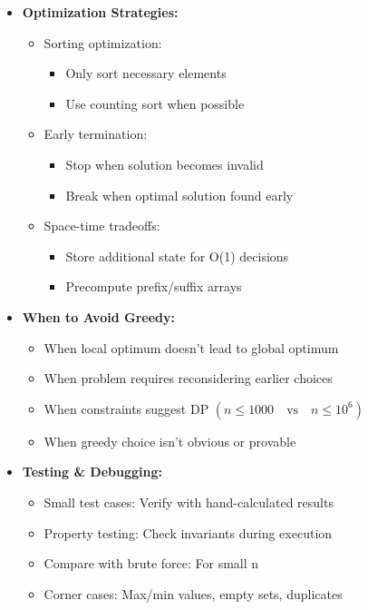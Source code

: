 \documentclass[a4paper,10pt]{book}
\begin{document}
\begin{itemize}
    \item \textbf{Optimization Strategies:}
    \begin{itemize}
        \item Sorting optimization:
        \begin{itemize}
            \item Only sort necessary elements
            \item Use counting sort when possible
        \end{itemize}
        \item Early termination:
        \begin{itemize}
            \item Stop when solution becomes invalid
            \item Break when optimal solution found early
        \end{itemize}
        \item Space-time tradeoffs:
        \begin{itemize}
            \item Store additional state for O(1) decisions
            \item Precompute prefix/suffix arrays
        \end{itemize}
    \end{itemize}
    
    \item \textbf{When to Avoid Greedy:}
    \begin{itemize}
        \item When local optimum doesn't lead to global optimum
        \item When problem requires reconsidering earlier choices
        \item When constraints suggest DP $(n \leq 1000 \quad \text{vs} \quad n \leq 10^6)$

        \item When greedy choice isn't obvious or provable
    \end{itemize}
    
    \item \textbf{Testing \& Debugging:}
    \begin{itemize}
        \item Small test cases: Verify with hand-calculated results
        \item Property testing: Check invariants during execution
        \item Compare with brute force: For small n
        \item Corner cases: Max/min values, empty sets, duplicates
    \end{itemize}
\end{itemize}
\end{document}
